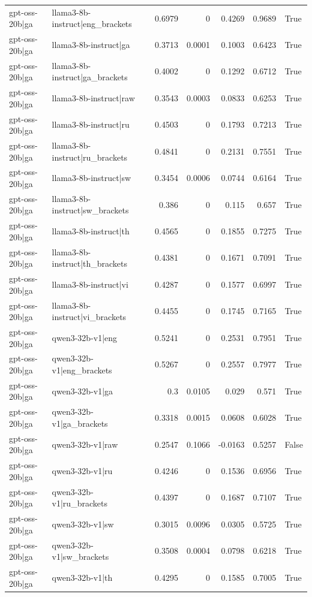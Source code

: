 \begin{table}
\begin{tabular}{l l r r r r l}
gpt-oss-20b|ga & llama3-8b-instruct|eng_brackets & 0.6979 & 0 & 0.4269 & 0.9689 & True \\
gpt-oss-20b|ga & llama3-8b-instruct|ga & 0.3713 & 0.0001 & 0.1003 & 0.6423 & True \\
gpt-oss-20b|ga & llama3-8b-instruct|ga_brackets & 0.4002 & 0 & 0.1292 & 0.6712 & True \\
gpt-oss-20b|ga & llama3-8b-instruct|raw & 0.3543 & 0.0003 & 0.0833 & 0.6253 & True \\
gpt-oss-20b|ga & llama3-8b-instruct|ru & 0.4503 & 0 & 0.1793 & 0.7213 & True \\
gpt-oss-20b|ga & llama3-8b-instruct|ru_brackets & 0.4841 & 0 & 0.2131 & 0.7551 & True \\
gpt-oss-20b|ga & llama3-8b-instruct|sw & 0.3454 & 0.0006 & 0.0744 & 0.6164 & True \\
gpt-oss-20b|ga & llama3-8b-instruct|sw_brackets & 0.386 & 0 & 0.115 & 0.657 & True \\
gpt-oss-20b|ga & llama3-8b-instruct|th & 0.4565 & 0 & 0.1855 & 0.7275 & True \\
gpt-oss-20b|ga & llama3-8b-instruct|th_brackets & 0.4381 & 0 & 0.1671 & 0.7091 & True \\
gpt-oss-20b|ga & llama3-8b-instruct|vi & 0.4287 & 0 & 0.1577 & 0.6997 & True \\
gpt-oss-20b|ga & llama3-8b-instruct|vi_brackets & 0.4455 & 0 & 0.1745 & 0.7165 & True \\
gpt-oss-20b|ga & qwen3-32b-v1|eng & 0.5241 & 0 & 0.2531 & 0.7951 & True \\
gpt-oss-20b|ga & qwen3-32b-v1|eng_brackets & 0.5267 & 0 & 0.2557 & 0.7977 & True \\
gpt-oss-20b|ga & qwen3-32b-v1|ga & 0.3 & 0.0105 & 0.029 & 0.571 & True \\
gpt-oss-20b|ga & qwen3-32b-v1|ga_brackets & 0.3318 & 0.0015 & 0.0608 & 0.6028 & True \\
gpt-oss-20b|ga & qwen3-32b-v1|raw & 0.2547 & 0.1066 & -0.0163 & 0.5257 & False \\
gpt-oss-20b|ga & qwen3-32b-v1|ru & 0.4246 & 0 & 0.1536 & 0.6956 & True \\
gpt-oss-20b|ga & qwen3-32b-v1|ru_brackets & 0.4397 & 0 & 0.1687 & 0.7107 & True \\
gpt-oss-20b|ga & qwen3-32b-v1|sw & 0.3015 & 0.0096 & 0.0305 & 0.5725 & True \\
gpt-oss-20b|ga & qwen3-32b-v1|sw_brackets & 0.3508 & 0.0004 & 0.0798 & 0.6218 & True \\
gpt-oss-20b|ga & qwen3-32b-v1|th & 0.4295 & 0 & 0.1585 & 0.7005 & True \\

\end{tabular}
\end{table}
